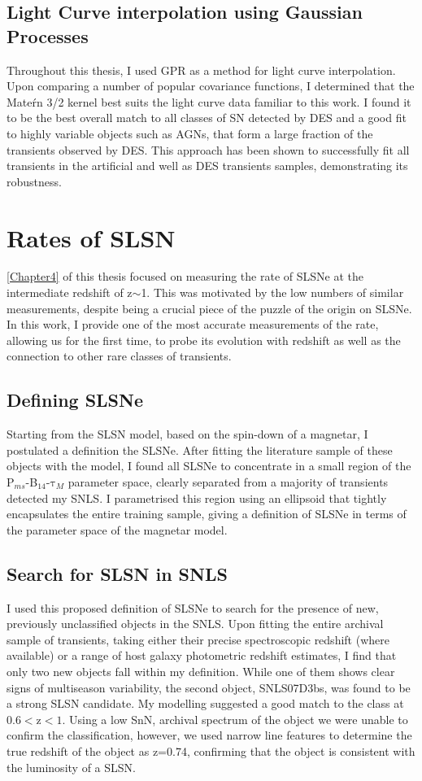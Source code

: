 \subsection{Light Curve interpolation using Gaussian Processes}
Throughout this thesis, I used GPR as a method for light curve interpolation. Upon comparing a number of popular covariance functions, I determined that the Mate\'rn 3/2 kernel best suits the light curve data familiar to this work. I found it to be the best overall match to all classes of SN detected by DES and a good fit to highly variable objects such as AGNs, that form a large fraction of the transients observed by DES. This approach has been shown to successfully fit all transients in the artificial and well as DES transients samples, demonstrating its robustness.

\section{Rates of SLSN}
\cref{Chapter4} of this thesis focused on measuring the rate of SLSNe at the intermediate redshift of z$\sim$1. This was motivated by the low numbers of similar measurements, despite being a crucial piece of the puzzle of the origin on SLSNe. In this work, I provide one of the most accurate measurements of the rate, allowing us for the first time, to probe its evolution with redshift as well as the connection to other rare classes of transients.

\subsection{Defining SLSNe}
Starting from the SLSN model, based on the spin-down of a magnetar, I postulated a definition the SLSNe. After fitting the literature sample of these objects with the model, I found all SLSNe to concentrate in a small region of the P$_{ms}$-B$_{14}$-$\mathrm{\tau}_M$ parameter space, clearly separated from a majority of transients detected my SNLS. I parametrised this region using an ellipsoid that tightly encapsulates the entire training sample, giving a definition of SLSNe in terms of the parameter space of the magnetar model.

\subsection{Search for SLSN in SNLS}
I used this proposed definition of SLSNe to search for the presence of new, previously unclassified objects in the SNLS. Upon fitting the entire archival sample of transients, taking either their precise spectroscopic redshift (where available) or a range of host galaxy photometric redshift estimates, I find that only two new objects fall within my definition. While one of them shows clear signs of multiseason variability, the second object, SNLS07D3bs, was found to be a strong SLSN candidate. My modelling suggested a good match to the class at 0.6$<$z$<1$. Using a low Sn\/N, archival spectrum of the object we were unable to confirm the classification, however, we used narrow line features to determine the true redshift of the object as z=0.74, confirming that the object is consistent with the luminosity of a SLSN.

